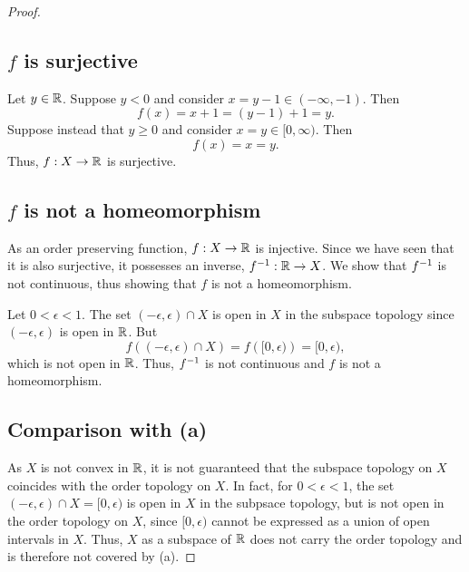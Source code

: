 \begin{solution}
\begin{proof}
    \subsection*{$f$ is surjective}
    Let $y \in \mathbb{R}$.
    Suppose $y < 0$ and consider $x = y - 1 \in (-\infty, -1)$.
    Then
    \begin{equation}
      f(x) = x + 1 = (y - 1) + 1 = y.
    \end{equation}
    Suppose instead that $y \geq 0$ and consider $x = y \in [0, \infty)$.
    Then
    \begin{equation}
      f(x) = x = y.
    \end{equation}
    Thus, $f: X \rightarrow \mathbb{R}$ is surjective.
    
    \subsection*{$f$ is not a homeomorphism}
    As an order preserving function, $f: X \rightarrow \mathbb{R}$ is injective.
    Since we have seen that it is also surjective, it possesses an inverse, $f^{-1}: \mathbb{R} \rightarrow X$.
    We show that $f^{-1}$ is not continuous, thus showing that $f$ is not a homeomorphism.

    Let $0 < \epsilon < 1$.
    The set $(-\epsilon, \epsilon) \cap X$ is open in $X$ in the subspace topology since $(-\epsilon, \epsilon)$ is open in $\mathbb{R}$.
    But
    \begin{equation}
      f\left((-\epsilon, \epsilon) \cap X\right) = f\left([0, \epsilon)\right) = [0, \epsilon),
    \end{equation}
    which is not open in $\mathbb{R}$.
    Thus, $f^{-1}$ is not continuous and $f$ is not a homeomorphism.

    \subsection*{Comparison with (a)}
    As $X$ is not convex in $\mathbb{R}$, it is not guaranteed that the subspace topology on $X$ coincides with the order topology on $X$.
    In fact, for $0 < \epsilon < 1$, the set $(-\epsilon, \epsilon) \cap X = [0, \epsilon)$ is open in $X$ in the subpsace topology, but is not open in the order topology on $X$, since $[0, \epsilon)$ cannot be expressed as a union of open intervals in $X$.
    Thus, $X$ as a subspace of $\mathbb{R}$ does not carry the order topology and is therefore not covered by (a).
  \end{proof}
\end{solution}
\newpage

